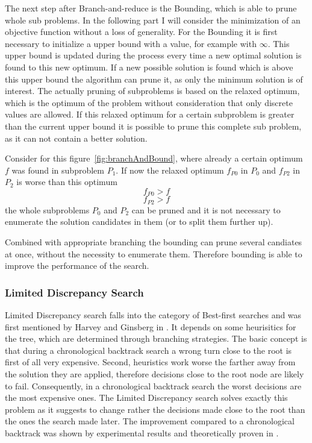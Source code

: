 \documentclass[10pt,
               a4paper,
               journal,
               ]{IEEEtran}
\newcommand{\reffig}[1]{{figure~\ref{#1}}}
\begin{document}
	The next step after Branch-and-reduce is the Bounding, which is able to prune whole sub problems. In the following part I will consider the minimization of an objective function without a loss of generality. For the Bounding it is first necessary to initialize a upper bound with a value, for example with $\infty$. This upper bound is updated during the process every time a new optimal solution is found to this new optimum. If a new possible solution is found which is above this upper bound the algorithm can prune it, as only the minimum solution is of interest. The actually pruning of subproblems is based on the relaxed optimum, which is the optimum of the problem without consideration that only discrete values are allowed. If this relaxed optimum for a certain subproblem is greater than the current upper bound it is possible to prune this complete sub problem, as it can not contain a better solution.
	
	Consider for this \reffig{fig:branchAndBound}, where already a certain optimum $f$ was found in subproblem $P_1$. If now the relaxed optimum $f_{P0}$ in $P_0$ and $f_{P2}$ in $P_2$ is worse than this optimum
	\begin{equation}
		f_{P0} > f
	\end{equation}
	\begin{equation}
		f_{P2} > f
	\end{equation}
	the whole subproblems $P_{0}$ and $P_{2}$ can be pruned and it is not necessary to enumerate the solution candidates in them (or to split them further up).
	
	Combined with appropriate branching the bounding can prune several candiates at once, without the necessity to enumerate them. Therefore bounding is able to improve the performance of the search.
	
	\subsubsection{Limited Discrepancy Search}
	Limited Discrepancy search falls into the category of Best-first searches and was first mentioned by Harvey and Ginsberg in \cite{limitedDiscrepancy}. It depends on some heurisitics for the tree, which are determined through branching strategies. The basic concept is that during a chronological backtrack search a wrong turn close to the root is first of all very expensive. Second, heuristics work worse the farther away from the solution they are applied, therefore decisions close to the root node are likely to fail. Consequently, in a chronological backtrack search the worst decisions are the most expensive ones. The Limited Discrepancy search solves exactly this problem as it suggests to change rather the decisions made close to the root than the ones the search made later. The improvement compared to a chronological backtrack was shown by experimental results and theoretically proven in \cite{limitedDiscrepancy}.
	
\end{document}
